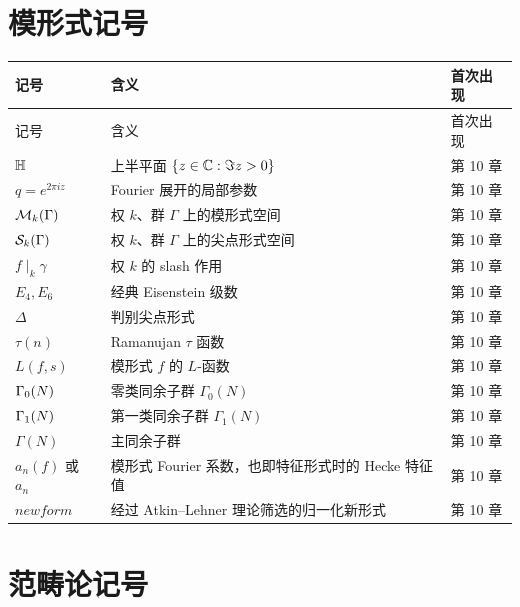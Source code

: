 \section{模形式记号}

\begin{longtable}{p{}p{}p{}}
\toprule
记号 & 含义 & 首次出现 \\
\midrule
\endfirsthead
\toprule
记号 & 含义 & 首次出现 \\
\midrule
\endhead
$\mathbb{H}$ & 上半平面 $\{z\in\mathbb{C}:\Im z>0\}$ & 第 10 章 \\
$q=e^{2\pi i z}$ & Fourier 展开的局部参数 & 第 10 章 \\
$\mathcal{M}_k(\Gamma)$ & 权 $k$、群 $\Gamma$ 上的模形式空间 & 第 10 章 \\
$\mathcal{S}_k(\Gamma)$ & 权 $k$、群 $\Gamma$ 上的尖点形式空间 & 第 10 章 \\
$f\mid_k \gamma$ & 权 $k$ 的 slash 作用 & 第 10 章 \\
$E_4,E_6$ & 经典 Eisenstein 级数 & 第 10 章 \\
$\Delta$ & 判别尖点形式 & 第 10 章 \\
$\tau(n)$ & Ramanujan $\tau$ 函数 & 第 10 章 \\
$L(f,s)$ & 模形式 $f$ 的 $L$-函数 & 第 10 章 \\
$\Gamma_0(N)$ & 零类同余子群 $\Gamma_0(N)$ & 第 10 章 \\
$\Gamma_1(N)$ & 第一类同余子群 $\Gamma_1(N)$ & 第 10 章 \\
$\Gamma(N)$ & 主同余子群 & 第 10 章 \\
$a_n(f)$ 或 $a_n$ & 模形式 Fourier 系数，也即特征形式时的 Hecke 特征值 & 第 10 章 \\
$newform$ & 经过 Atkin--Lehner 理论筛选的归一化新形式 & 第 10 章 \\
\bottomrule
\end{longtable}

\section{范畴论记号}


